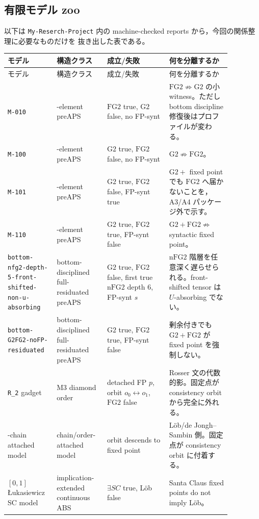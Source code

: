 ﻿\documentclass[a4paper,10pt]{ltjsarticle}
\newcommand{\Gtwo}{\mathrm{G2}}
\newcommand{\FGtwo}{\mathrm{FG2}}
\newcommand{\nFGtwo}{\mathrm{nFG2}}
\newcommand{\Repo}{\texttt{My-Reserch-Project}}
\begin{document}
\subsection{有限モデル zoo}

以下は \Repo{} 内の machine-checked reports から，今回の関係整理に必要なものだけを
抜き出した表である。

\begin{longtable}{>{\raggedright\arraybackslash}p{0.19\linewidth}
>{\raggedright\arraybackslash}p{0.18\linewidth}
>{\raggedright\arraybackslash}p{0.25\linewidth}
>{\raggedright\arraybackslash}p{0.25\linewidth}}
\toprule
モデル & 構造クラス & 成立/失敗 & 何を分離するか \\
\midrule
\endfirsthead
\toprule
モデル & 構造クラス & 成立/失敗 & 何を分離するか \\
\midrule
\endhead
\texttt{M-010} &
3-element preAPS &
\(\FGtwo\) true, \(\Gtwo\) false, no FP-synt &
\(\FGtwo\not\Rightarrow\Gtwo\) の小 witness。ただし bottom discipline 修復後はプロファイルが変わる。\\
\texttt{M-100} &
3-element preAPS &
\(\Gtwo\) true, \(\FGtwo\) false, no FP-synt &
\(\Gtwo\not\Rightarrow\FGtwo\)。\\
\texttt{M-101} &
3-element preAPS &
\(\Gtwo\) true, \(\FGtwo\) false, FP-synt true &
\(\Gtwo+\) fixed point でも \(\FGtwo\) へ届かないことを，A3/A4 パッケージ外で示す。\\
\texttt{M-110} &
3-element preAPS &
\(\Gtwo\) true, \(\FGtwo\) true, FP-synt false &
\(\Gtwo+\FGtwo\not\Rightarrow\) syntactic fixed point。\\
\texttt{bottom-nfg2-depth-5-front-shifted-non-u-absorbing} &
bottom-disciplined full-residuated preAPS &
\(\Gtwo\) true, \(\FGtwo\) false, first true \(\nFGtwo\) depth \(6\), FP-synt \(s\) &
\(\nFGtwo\) 階層を任意深く遅らせられる。front-shifted tensor は \(U\)-absorbing でない。\\
\texttt{bottom-G2FG2-noFP-residuated} &
bottom-disciplined full-residuated preAPS &
\(\Gtwo\) true, \(\FGtwo\) true, FP-synt false &
剰余付きでも \(\Gtwo+\FGtwo\) が fixed point を強制しない。\\
\texttt{R\_2} gadget &
M3 diamond order &
detached FP \(p\), orbit \(o_0\leftrightarrow o_1\), \(\FGtwo\) false &
Rosser 文の代数的影。固定点が consistency orbit から完全に外れる。\\
3-chain attached model &
chain/order-attached model &
orbit descends to fixed point &
Löb/de Jongh--Sambin 側。固定点が consistency orbit に付着する。\\
\([0,1]\) Łukasiewicz SC model &
implication-extended continuous ABS &
\(\exists SC\) true, Löb false &
Santa Claus fixed points do not imply Löb。\\
\bottomrule
\end{longtable}
\end{document}
